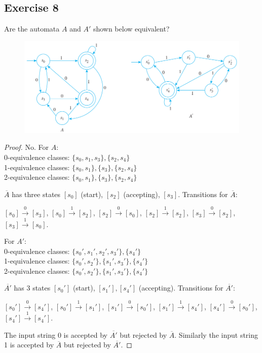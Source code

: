 \documentclass[14pt]{extarticle}
\begin{document}
\subsection{Exercise 8}
Are the automata \(A\) and \(A'\) shown below equivalent?

\begin{figure}[ht!]
    \centering
    \includegraphics[scale=0.5]{../images/12.3.8.png}
\end{figure}

\begin{proof}
    No. For \(A\): \\
    0-equivalence classes: \(\{s_0, s_1, s_3\}, \{s_2, s_4\}\) \\
    1-equivalence classes: \(\{s_0, s_1\}, \{s_3\}, \{s_2, s_4\}\) \\
    2-equivalence classes: \(\{s_0, s_1\}, \{s_3\}, \{s_2, s_4\}\)

    \(\overline{A}\) has three states \([s_0]\) (start), \([s_2]\) (accepting), \([s_3]\). Transitions for \(\overline{A}\):

    \([s_0] \overset{0}{\to} [s_3]\), \([s_0] \overset{1}{\to} [s_2]\), \([s_2] \overset{0}{\to} [s_0]\),
    \([s_2] \overset{1}{\to} [s_2]\), \([s_3] \overset{0}{\to} [s_2]\), \([s_3] \overset{1}{\to} [s_0]\).

    For \(A'\): \\
    0-equivalence classes: \(\{s_0', s_1', s_2', s_3'\}, \{s_4'\}\) \\
    1-equivalence classes: \(\{s_0', s_2'\}, \{s_1', s_3'\}, \{s_4'\}\) \\
    2-equivalence classes: \(\{s_0', s_2'\}, \{s_1', s_3'\}, \{s_4'\}\)

    \(\overline{A'}\) has 3 states \([s_0']\) (start), \([s_1'],[s_4']\) (accepting). Transitions for \(\overline{A'}\):

    \([s_0'] \overset{0}{\to} [s_4']\), \([s_0'] \overset{1}{\to} [s_1']\), \([s_1'] \overset{0}{\to} [s_0']\),
    \([s_1'] \overset{1}{\to} [s_4']\), \([s_4'] \overset{0}{\to} [s_0']\), \([s_4'] \overset{1}{\to} [s_4']\).

    The input string 0 is accepted by \(\overline{A'}\) but rejected by \(\overline{A}\). Similarly the input string 1 is
    accepted by \(\overline{A}\) but rejected by \(\overline{A'}\).
\end{proof}
\end{document}
